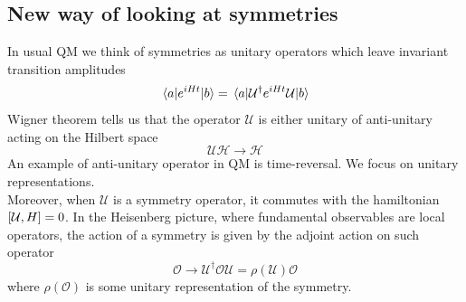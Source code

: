 \documentclass[11pt]{article}
\theoremstyle{definition}
\numberwithin{equation}{section}
\newcommand*\cH{\mathcal{H}}
\newcommand*\cO{\mathcal{O}}
\newcommand*\cU{\mathcal{U}}
\begin{document}
\subsection{New way of looking at symmetries}
In usual QM we think of symmetries as unitary operators which leave invariant transition amplitudes
\begin{equation}
	\mel{a}{e^{iHt}}{b}=\mel{a}{\cU^{\dagger}e^{iHt}\cU}{b}
\end{equation}
Wigner theorem tells us that the operator $\cU$ is either unitary of anti-unitary acting on the Hilbert space
\begin{equation}
	\cU\cH\rightarrow \cH
\end{equation}
An example of anti-unitary operator in QM is time-reversal. We focus on unitary representations.\\
Moreover, when $\cU$ is a symmetry operator, it commutes with the hamiltonian $\comm{\cU}{H}=0$. In the Heisenberg picture, where fundamental observables are local operators, the action of a symmetry is given by the adjoint action on such operator
\begin{equation}
	\cO\rightarrow \cU^{\dagger} \cO \cU=\rho(\cU)\cO
\end{equation}
where $\rho(\cO)$ is some unitary representation of the symmetry.
\end{document}
